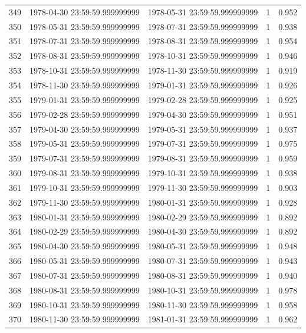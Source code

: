 \begin{table}
\begin{tabular}{lcccc}
349 & 1978-04-30 23:59:59.999999999 & 1978-05-31 23:59:59.999999999 & 1 & 0.952 \\
350 & 1978-05-31 23:59:59.999999999 & 1978-07-31 23:59:59.999999999 & 1 & 0.938 \\
351 & 1978-07-31 23:59:59.999999999 & 1978-08-31 23:59:59.999999999 & 1 & 0.954 \\
352 & 1978-08-31 23:59:59.999999999 & 1978-10-31 23:59:59.999999999 & 1 & 0.946 \\
353 & 1978-10-31 23:59:59.999999999 & 1978-11-30 23:59:59.999999999 & 1 & 0.919 \\
354 & 1978-11-30 23:59:59.999999999 & 1979-01-31 23:59:59.999999999 & 1 & 0.926 \\
355 & 1979-01-31 23:59:59.999999999 & 1979-02-28 23:59:59.999999999 & 1 & 0.925 \\
356 & 1979-02-28 23:59:59.999999999 & 1979-04-30 23:59:59.999999999 & 1 & 0.951 \\
357 & 1979-04-30 23:59:59.999999999 & 1979-05-31 23:59:59.999999999 & 1 & 0.937 \\
358 & 1979-05-31 23:59:59.999999999 & 1979-07-31 23:59:59.999999999 & 1 & 0.975 \\
359 & 1979-07-31 23:59:59.999999999 & 1979-08-31 23:59:59.999999999 & 1 & 0.959 \\
360 & 1979-08-31 23:59:59.999999999 & 1979-10-31 23:59:59.999999999 & 1 & 0.938 \\
361 & 1979-10-31 23:59:59.999999999 & 1979-11-30 23:59:59.999999999 & 1 & 0.903 \\
362 & 1979-11-30 23:59:59.999999999 & 1980-01-31 23:59:59.999999999 & 1 & 0.928 \\
363 & 1980-01-31 23:59:59.999999999 & 1980-02-29 23:59:59.999999999 & 1 & 0.892 \\
364 & 1980-02-29 23:59:59.999999999 & 1980-04-30 23:59:59.999999999 & 1 & 0.892 \\
365 & 1980-04-30 23:59:59.999999999 & 1980-05-31 23:59:59.999999999 & 1 & 0.948 \\
366 & 1980-05-31 23:59:59.999999999 & 1980-07-31 23:59:59.999999999 & 1 & 0.943 \\
367 & 1980-07-31 23:59:59.999999999 & 1980-08-31 23:59:59.999999999 & 1 & 0.940 \\
368 & 1980-08-31 23:59:59.999999999 & 1980-10-31 23:59:59.999999999 & 1 & 0.978 \\
369 & 1980-10-31 23:59:59.999999999 & 1980-11-30 23:59:59.999999999 & 1 & 0.958 \\
370 & 1980-11-30 23:59:59.999999999 & 1981-01-31 23:59:59.999999999 & 1 & 0.962 \\

\end{tabular}
\end{table}
